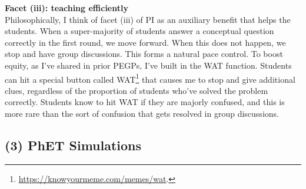 \documentclass[../../../main.tex]{subfiles}
\begin{document}
\textbf{Facet (iii): teaching efficiently}
\\
\vspace{0.25cm}
Philosophically, I think of facet (iii) of PI as an auxiliary benefit that helps the students.  When a super-majority of students answer a conceptual question correctly in the first round, we move forward.  When this does not happen, we stop and have group discussions.  This forms a natural pace control.  To boost equity, as I've shared in prior PEGPs, I've built in the WAT function.  Students can hit a special button called WAT\footnote{\url{https://knowyourmeme.com/memes/wat}.} that causes me to stop and give additional clues, regardless of the proportion of students who've solved the problem correctly.  Students know to hit WAT if they are majorly confused, and this is more rare than the sort of confusion that gets resolved in group discussions.

\subsection{(3) PhET Simulations}
\end{document}
